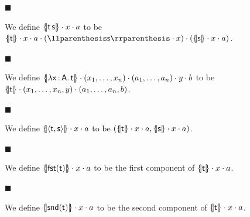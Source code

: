 \documentclass[10pt,a4paper]{amsart}
\begin{document}
 
\par\noindent  $\blacksquare$ 
 
We define $\{\hskip-2.25pt|\mathsf{t}\,\mathsf{s}|\hskip-2.25pt\}\cdot x\cdot a$ to be $\{\hskip-2.25pt|\mathsf{t}|\hskip-2.25pt\}\cdot x\cdot a\cdot(\llparenthesis%
\mathsf{s}\rrparenthesis\cdot x)\cdot(\{\hskip-2.25pt|\mathsf{s}|\hskip-2.25pt%
\}\cdot x\cdot a)$.\par
 
 
 
\par\noindent  $\blacksquare$ 
 
We define $\{\hskip-2.25pt|\lambda\mathsf{x}\,{:}\,\mathsf{A}.\,\mathsf{t}|\hskip-2.25pt%
\}\cdot(x_{1},\ldots,x_{n})\cdot(a_{1},\ldots,a_{n})\cdot y\cdot b$ to be $\{\hskip-2.25pt|\mathsf{t}|\hskip-2.25pt\}\cdot(x_{1},\ldots,x_{n},y)\cdot(a_{%
1},\ldots,a_{n},b)$.\par
 
 
 
\par\noindent  $\blacksquare$ 
 
We define $\{\hskip-2.25pt|\langle\mathsf{t},\mathsf{s}\rangle|\hskip-2.25pt\}\cdot x\cdot
a$ to be $(\{\hskip-2.25pt|\mathsf{t}|\hskip-2.25pt\}\cdot x\cdot a,\{\hskip-2.25pt|%
\mathsf{s}|\hskip-2.25pt\}\cdot x\cdot a)$.\par
 
 
 
\par\noindent  $\blacksquare$ 
 
We define $\{\hskip-2.25pt|\mathsf{fst}(\mathsf{t})|\hskip-2.25pt\}\cdot x\cdot a$ to be the first component of $\{\hskip-2.25pt|\mathsf{t}|\hskip-2.25pt\}\cdot x\cdot a$.\par
 
 
 
\par\noindent  $\blacksquare$ 
 
We define $\{\hskip-2.25pt|\mathsf{snd}(\mathsf{t})|\hskip-2.25pt\}\cdot x\cdot a$ to be the second component of $\{\hskip-2.25pt|\mathsf{t}|\hskip-2.25pt\}\cdot x\cdot a$.\par
 
 
  
 
 
\end{document}
